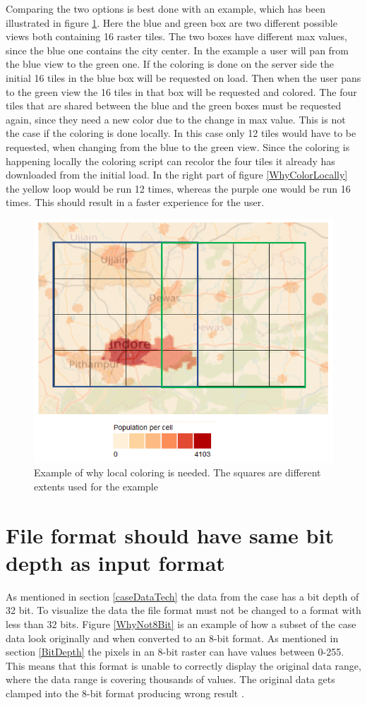 Comparing the two options is best done with an example, which has been illustrated in figure \ref{WhyColorLocallyMap}. Here the blue and green box are two different possible views both containing 16 raster tiles. The two boxes have different max values, since the blue one contains the city center. In the example a user will pan from the blue view to the green one. If the coloring is done on the server side the initial 16 tiles in the blue box will be requested on load. Then when the user pans to the green view the 16 tiles in that box will be requested and colored. The four tiles that are shared between the blue and the green boxes must be requested again, since they need a new color due to the change in max value. This is not the case if the coloring is done locally. In this case only 12 tiles would have to be requested, when changing from the blue to the green view. Since the coloring is happening locally the coloring script can recolor the four tiles it already has downloaded from the initial load.  In the right part of figure \ref{WhyColorLocally} the yellow loop would be run 12 times, whereas the purple one would be run 16 times. This should result in a faster experience for the user.

\begin{figure} [H]
	\centering
	\includegraphics[width=.6\textwidth]{Pictures/WhyColorLocallyMap}
	\caption{Example of why local coloring is needed. The squares are different extents used for the example}
	\label{WhyColorLocallyMap}
\end{figure}

\section{File format should have same bit depth as input format}\label{NeededDepth}
As mentioned in section \ref{caseDataTech} the data from the case has a bit depth of 32 bit. To visualize the data the file format must not be changed to a format with less than 32 bits. Figure \ref{WhyNot8Bit} is an example of how a subset of the case data look originally and when converted to an 8-bit format. As mentioned in section \ref{BitDepth} the pixels in an 8-bit raster can have values between 0-255. This means that this format is unable to correctly display the original data range, where the data range is covering thousands of values. The original data gets clamped into the 8-bit format producing wrong result \citep{gdal2tilesDoc}.


